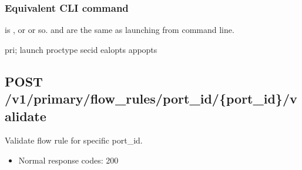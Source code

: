 \documentclass[a4paper,11pt,openany,oneside,english]{sphinxmanual}
\begin{document}
\subsubsection{Equivalent CLI command}
\label{\detokenize{api_ref/spp_primary:id20}}
 is ,  or  or so.
 and  are the same as launching from command line.

\begin{sphinxVerbatim}[commandchars=\\\{\},formatcom=\footnotesize]
pri; launch \PYGZob{}proc\PYGZus{}type\PYGZcb{} \PYGZob{}sec\PYGZus{}id\PYGZcb{} \PYGZob{}eal\PYGZus{}opts\PYGZcb{} \PYGZhy{}\PYGZhy{} \PYGZob{}app\PYGZus{}opts\PYGZcb{}
\end{sphinxVerbatim}


\subsection{POST /v1/primary/flow\_rules/port\_id/\{port\_id\}/validate}
\label{\detokenize{api_ref/spp_primary:post-v1-primary-flow-rules-port-id-port-id-validate}}
Validate flow rule for specific port\_id.
\begin{itemize}
\item {} 
Normal response codes: 200

\end{itemize}
\end{document}
